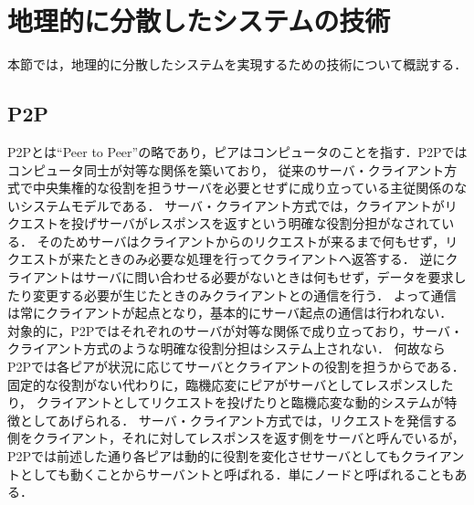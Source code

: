 \section{地理的に分散したシステムの技術}
\label{background:geographically-disdtributed-system-technology}
本節では，地理的に分散したシステムを実現するための技術について概説する．

\subsection{P2P}
P2Pとは``Peer to Peer''の略であり，ピアはコンピュータのことを指す．P2Pではコンピュータ同士が対等な関係を築いており，
従来のサーバ・クライアント方式で中央集権的な役割を担うサーバを必要とせずに成り立っている主従関係のないシステムモデルである．
サーバ・クライアント方式では，クライアントがリクエストを投げサーバがレスポンスを返すという明確な役割分担がなされている．
そのためサーバはクライアントからのリクエストが来るまで何もせず，リクエストが来たときのみ必要な処理を行ってクライアントへ返答する．
逆にクライアントはサーバに問い合わせる必要がないときは何もせず，データを要求したり変更する必要が生じたときのみクライアントとの通信を行う．
よって通信は常にクライアントが起点となり，基本的にサーバ起点の通信は行われない．
対象的に，P2Pではそれぞれのサーバが対等な関係で成り立っており，サーバ・クライアント方式のような明確な役割分担はシステム上されない．
何故ならP2Pでは各ピアが状況に応じてサーバとクライアントの役割を担うからである．固定的な役割がない代わりに，臨機応変にピアがサーバとしてレスポンスしたり，
クライアントとしてリクエストを投げたりと臨機応変な動的システムが特徴としてあげられる．
サーバ・クライアント方式では，リクエストを発信する側をクライアント，それに対してレスポンスを返す側をサーバと呼んでいるが，
P2Pでは前述した通り各ピアは動的に役割を変化させサーバとしてもクライアントとしても動くことからサーバントと呼ばれる．単にノードと呼ばれることもある．

